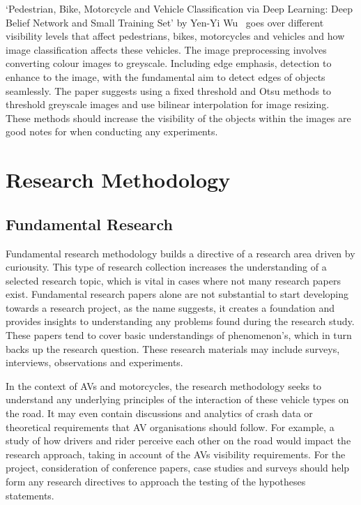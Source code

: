 \documentclass[12pt]{report} %
\begin{document}
		`Pedestrian, Bike, Motorcycle and Vehicle Classification via Deep Learning: Deep Belief Network and Small Training Set' by Yen-Yi Wu~\cite{wu_pedestrian_2016} goes over different visibility levels that affect pedestrians, bikes, motorcycles and vehicles and how image classification affects these vehicles. The image preprocessing involves converting colour images to greyscale. Including edge emphasis, detection to enhance to the image, with the fundamental aim to detect edges of objects seamlessly. The paper suggests using a fixed threshold and Otsu methods to threshold greyscale images and use bilinear interpolation for image resizing. These methods should increase the visibility of the objects within the images are good notes for when conducting any experiments.

\chapter{Research Methodology}
\label{chap:researchMethodology}
	\section{Fundamental Research}
		Fundamental research methodology builds a directive of a research area driven by curiousity. This type of research collection increases the understanding of a selected research topic, which is vital in cases where not many research papers exist. Fundamental research papers alone are not substantial to start developing towards a research project, as the name suggests, it creates a foundation and provides insights to understanding any problems found during the research study. These papers tend to cover basic understandings of phenomenon's, which in turn backs up the research question. These research materials may include surveys, interviews, observations and experiments.~\cite{saunders_research_2012}

		In the context of AVs and motorcycles, the research methodology seeks to understand any underlying principles of the interaction of these vehicle types on the road. It may even contain discussions and analytics of crash data or theoretical requirements that AV organisations should follow. For example, a study of how drivers and rider perceive each other on the road would impact the research approach, taking in account of the AVs visibility requirements. For the project, consideration of conference papers, case studies and surveys should help form any research directives to approach the testing of the hypotheses statements.
\end{document}
